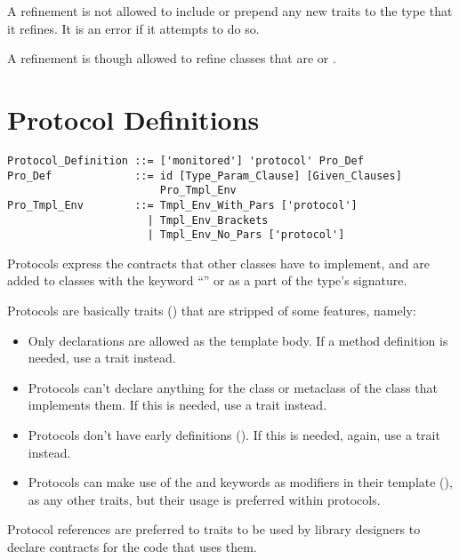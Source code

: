 A refinement is not allowed to include or prepend any new traits to the type that it refines. It is an error if it attempts to do so. 

A refinement is though allowed to refine classes that are  or . 






\section{Protocol Definitions}
\label{sec:protocols}

\grammar\begin{lstlisting}
Protocol_Definition ::= ['monitored'] 'protocol' Pro_Def
Pro_Def             ::= id [Type_Param_Clause] [Given_Clauses]
                        Pro_Tmpl_Env
Pro_Tmpl_Env        ::= Tmpl_Env_With_Pars ['protocol']
                      | Tmpl_Env_Brackets
                      | Tmpl_Env_No_Pars ['protocol']
\end{lstlisting}

Protocols express the contracts that other classes have to implement, and are added to classes with the keyword ``'' or as a part of the type's signature. 

Protocols are basically traits () that are stripped of some features, namely: 
\begin{itemize}
  \item Only declarations are allowed as the template body. If a method definition is needed, use a trait instead. 

  \item Protocols can't declare anything for the class or metaclass of the class that implements them. If this is needed, use a trait instead. 

  \item Protocols don't have early definitions (). If this is needed, again, use a trait instead. 

  \item Protocols can make use of the  and  keywords as modifiers in their template (), as any other traits, but their usage is preferred within protocols. 
\end{itemize}

Protocol references are preferred to traits to be used by library designers to declare contracts for the code that uses them. 





